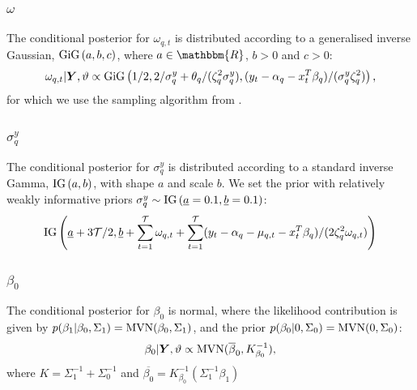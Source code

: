 \subsubsection{$\omega$}
%
The conditional posterior for $\omega_{q,t}$ is distributed according to a generalised inverse Gaussian, $\text{\normalfont GiG}\left(a,b,c\right)$, where $a \in \mathbbm{R}$, $b>0$ and $c>0$:
%
\begin{equation}
    \omega_{q,t} \vert \boldsymbol{Y}, \vartheta \propto \text{\normalfont GiG}\left(1/2,2/\sigma^y_q + \theta_q/(\zeta^2_q \sigma^y_q),(y_t - \alpha_q - x_t^T\beta_q)/(\sigma^y_q\zeta^2_q)\right),
\end{equation}
%
for which we use the sampling algorithm from \citet{devroye2014random}.
%
\subsubsection{$\sigma^y_q$}
%
The conditional posterior for $\sigma^y_q$ is distributed according to a standard inverse Gamma, $\text{\normalfont IG}\left(a,b\right)$, with shape $a$ and scale $b$. We set the prior with relatively weakly informative priors $\sigma^y_q \sim \text{\normalfont IG}\left(\underline{a}=0.1,\underline{b}=0.1\right)$:
%
\begin{equation}
    \text{\normalfont IG}\left(\underline{a} + 3\mathcal{T}/2, \underline{b} + \sum_{t=1}^{\mathcal{T}} \omega_{q,t} + \sum_{t=1}^{\mathcal{T}} (y_t - \alpha_q - \mu_{q,t} - x^{T}_t \beta_q)/(2\zeta^2_q\omega_{q,t})\right)
\end{equation}
%
\subsubsection{$\beta_0$}
%
The conditional posterior for $\beta_0$ is normal, where the likelihood contribution is given by $p(\beta_1\vert\beta_0,\Sigma_1) = \mathrm{MVN}(\beta_0,\Sigma_1)$, and the prior $p(\beta_0|0,\Sigma_0) = \mathrm{MVN}(0,\Sigma_0)$:
%
\begin{equation}
    \beta_0 \vert \boldsymbol{Y}, \vartheta \propto \mathrm{MVN}(\overline{\beta}_0,K^{-1}_{\beta_0}),
\end{equation}
%
where $K = \Sigma_1^{-1} + \Sigma^{-1}_0$ and $\overline{\beta_0} = K^{-1}_{\beta_0}\left( \Sigma^{-1}_1\beta_1 \right) $
%
